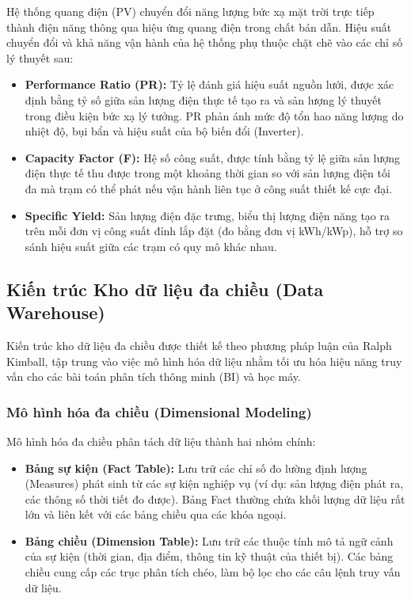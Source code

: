 \documentclass[12pt,a4paper]{article}
\begin{document}
Hệ thống quang điện (PV) chuyển đổi năng lượng bức xạ mặt trời trực tiếp thành điện năng thông qua hiệu ứng quang điện trong chất bán dẫn. Hiệu suất chuyển đổi và khả năng vận hành của hệ thống phụ thuộc chặt chẽ vào các chỉ số lý thuyết sau:
\begin{itemize}
    \item \textbf{Performance Ratio (PR):} Tỷ lệ đánh giá hiệu suất nguồn lưới, được xác định bằng tỷ số giữa sản lượng điện thực tế tạo ra và sản lượng lý thuyết trong điều kiện bức xạ lý tưởng. PR phản ánh mức độ tổn hao năng lượng do nhiệt độ, bụi bẩn và hiệu suất của bộ biến đổi (Inverter).
    \item \textbf{Capacity Factor (F):} Hệ số công suất, được tính bằng tỷ lệ giữa sản lượng điện thực tế thu được trong một khoảng thời gian so với sản lượng điện tối đa mà trạm có thể phát nếu vận hành liên tục ở công suất thiết kế cực đại.
    \item \textbf{Specific Yield:} Sản lượng điện đặc trưng, biểu thị lượng điện năng tạo ra trên mỗi đơn vị công suất đỉnh lắp đặt (đo bằng đơn vị kWh/kWp), hỗ trợ so sánh hiệu suất giữa các trạm có quy mô khác nhau.
\end{itemize}

\subsection{Kiến trúc Kho dữ liệu đa chiều (Data Warehouse)}
\label{sec:dwh_theory}

Kiến trúc kho dữ liệu đa chiều được thiết kế theo phương pháp luận của Ralph Kimball, tập trung vào việc mô hình hóa dữ liệu nhằm tối ưu hóa hiệu năng truy vấn cho các bài toán phân tích thông minh (BI) và học máy.

\subsubsection{Mô hình hóa đa chiều (Dimensional Modeling)}
Mô hình hóa đa chiều phân tách dữ liệu thành hai nhóm chính:
\begin{itemize}
    \item \textbf{Bảng sự kiện (Fact Table):} Lưu trữ các chỉ số đo lường định lượng (Measures) phát sinh từ các sự kiện nghiệp vụ (ví dụ: sản lượng điện phát ra, các thông số thời tiết đo được). Bảng Fact thường chứa khối lượng dữ liệu rất lớn và liên kết với các bảng chiều qua các khóa ngoại.
    \item \textbf{Bảng chiều (Dimension Table):} Lưu trữ các thuộc tính mô tả ngữ cảnh của sự kiện (thời gian, địa điểm, thông tin kỹ thuật của thiết bị). Các bảng chiều cung cấp các trục phân tích chéo, làm bộ lọc cho các câu lệnh truy vấn dữ liệu.
\end{itemize}
\end{document}
